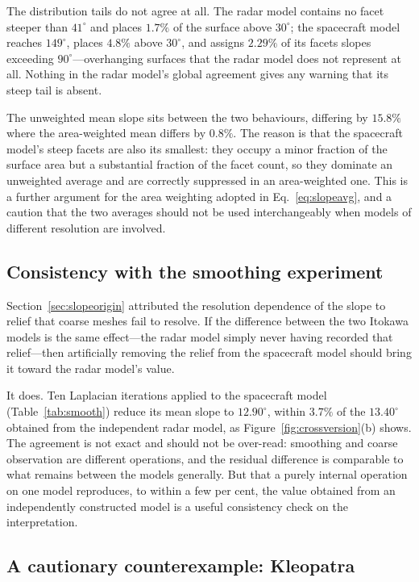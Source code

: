 The distribution tails do not agree at all. The radar model contains no facet
steeper than $41^{\circ}$ and places $1.7\%$ of the surface above $30^{\circ}$;
the spacecraft model reaches $149^{\circ}$, places $4.8\%$ above $30^{\circ}$,
and assigns $2.29\%$ of its facets slopes exceeding $90^{\circ}$---overhanging
surfaces that the radar model does not represent at all. Nothing in the radar
model's global agreement gives any warning that its steep tail is absent.

The unweighted mean slope sits between the two behaviours, differing by
$15.8\%$ where the area-weighted mean differs by $0.8\%$. The reason is that
the spacecraft model's steep facets are also its smallest: they occupy a minor
fraction of the surface area but a substantial fraction of the facet count, so
they dominate an unweighted average and are correctly suppressed in an
area-weighted one. This is a further argument for the area weighting adopted in
Eq.~\eqref{eq:slopeavg}, and a caution that the two averages should not be used
interchangeably when models of different resolution are involved.

\subsection{Consistency with the smoothing experiment}
\label{sec:xvsmooth}

Section~\ref{sec:slopeorigin} attributed the resolution dependence of the slope
to relief that coarse meshes fail to resolve. If the difference between the two
Itokawa models is the same effect---the radar model simply never having
recorded that relief---then artificially removing the relief from the
spacecraft model should bring it toward the radar model's value.

It does. Ten Laplacian iterations applied to the spacecraft model
(Table~\ref{tab:smooth}) reduce its mean slope to $12.90^{\circ}$, within
$3.7\%$ of the $13.40^{\circ}$ obtained from the independent radar model, as
Figure~\ref{fig:crossversion}(b) shows. The
agreement is not exact and should not be over-read: smoothing and coarse
observation are different operations, and the residual difference is comparable
to what remains between the models generally. But that a purely internal
operation on one model reproduces, to within a few per cent, the value obtained
from an independently constructed model is a useful consistency check on the
interpretation.

\subsection{A cautionary counterexample: Kleopatra}
\label{sec:kleopatraxv}

